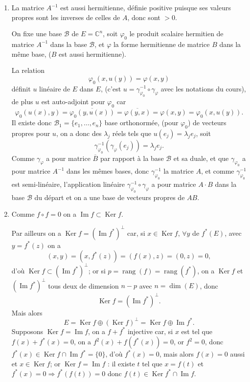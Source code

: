 \begin{enumerate}[label=\arabic*.,leftmargin=2.2em,itemsep=1.15em]
Donc si $n=2p$, ce rayon spectral est 4 et $\|\!|A\|\!|=2$, alors que si $n=2p+1$, le rayon spectral est
\[
4\sin^2\frac{p\pi}{2p+1}
\qquad\text{et}\qquad
\|\!|A\|\!|=2\sin\frac{p\pi}{2p+1}.
\]

\item La matrice $A^{-1}$ est aussi hermitienne, définie positive puisque ses valeurs propres sont les inverses de celles de $A$, donc sont $>0$.

On fixe une base $\mathcal B$ de $E=\mathbb C^n$, soit $\varphi_0$ le produit scalaire hermitien de matrice $A^{-1}$ dans la base $\mathcal B$, et $\varphi$ la forme hermitienne de matrice $B$ dans la même base, ($B$ est aussi hermitienne).

La relation
\[
\varphi_0(x,u(y))=\varphi(x,y)
\]
définit $u$ linéaire de $E$ dans $E$, (c'est $u=\gamma_{\varphi_0}^{-1}\circ\gamma_\varphi$ avec les notations du cours), de plus $u$ est auto-adjoint pour $\varphi_0$ car
\[
\varphi_0(u(x),y)=\overline{\varphi_0(y,u(x))}=\overline{\varphi(y,x)}=\varphi(x,y)=\varphi_0(x,u(y)).
\]
Il existe donc $\mathcal B_1=\{e_1,\ldots,e_n\}$ base orthonormée, (pour $\varphi_0$) de vecteurs propres pour $u$, on a donc des $\lambda_j$ réels tels que $u(e_j)=\lambda_je_j$, soit
\[
\gamma_{\varphi_0}^{-1}(\gamma_\varphi(e_j))=\lambda_je_j.
\]
Comme $\gamma_\varphi$ a pour matrice $\overline B$ par rapport à la base $\mathcal B$ et sa duale, et que $\gamma_{\varphi_0}$ a pour matrice $A^{-1}$ dans les mêmes bases, donc $\gamma_{\varphi_0}^{-1}$ la matrice $A$, et comme $\gamma_{\varphi_0}^{-1}$ est semi-linéaire, l'application linéaire $\gamma_{\varphi_0}^{-1}\circ\gamma_\varphi$ a pour matrice $A\cdot B$ dans la base $\mathcal B$ du départ et on a une base de vecteurs propres de $AB$.

\item Comme $f\circ f=0$ on a $\operatorname{Im}f\subset\operatorname{Ker}f$.

Par ailleurs on a $\operatorname{Ker}f=(\operatorname{Im}f^*)^\perp$ car, si $x\in\operatorname{Ker}f$, $\forall y$ de $f^*(E)$, avec $y=f^*(z)$ on a
\[
(x,y)=(x,f^*(z))=(f(x),z)=(0,z)=0,
\]
d'où $\operatorname{Ker}f\subset(\operatorname{Im}f^*)^\perp$; or si $p=\operatorname{rang}(f)=\operatorname{rang}(f^*)$, on a $\operatorname{Ker}f$ et $(\operatorname{Im}f^*)^\perp$ tous deux de dimension $n-p$ avec $n=\dim(E)$, donc
\[
\operatorname{Ker}f=(\operatorname{Im}f^*)^\perp.
\]
Mais alors
\[
E=\operatorname{Ker}f\oplus(\operatorname{Ker}f)^\perp
=\operatorname{Ker}f\oplus\operatorname{Im}f^*.
\]
Supposons $\operatorname{Ker}f=\operatorname{Im}f$, on a $f+f^*$ injective car, si $x$ est tel que $f(x)+f^*(x)=0$, on a $f^2(x)+f(f^*(x))=0$, or $f^2=0$, donc $f^*(x)\in\operatorname{Ker}f\cap\operatorname{Im}f^*=\{0\}$, d'où $f^*(x)=0$, mais alors $f(x)=0$ aussi et $x\in\operatorname{Ker}f$; or $\operatorname{Ker}f=\operatorname{Im}f$ : il existe $t$ tel que $x=f(t)$ et $f^*(x)=0\Rightarrow f^*(f(t))=0$ donc $f(t)\in\operatorname{Ker}f^*\cap\operatorname{Im}f$.


\end{enumerate}
